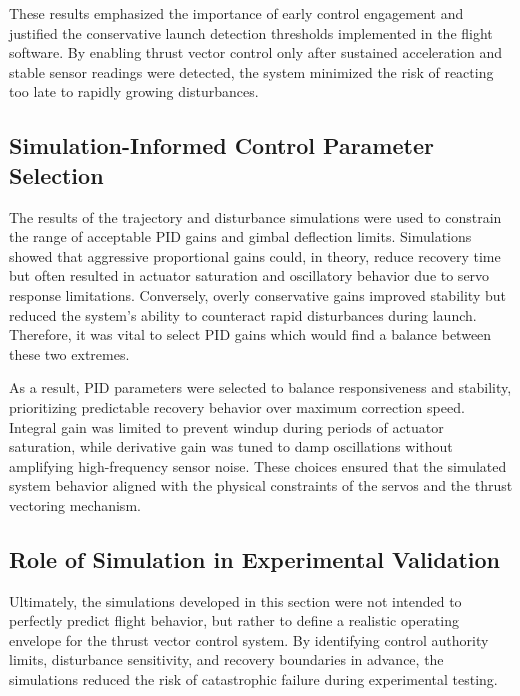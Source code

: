 These results emphasized the importance of early control engagement and justified the conservative launch detection thresholds implemented in the flight software. By enabling thrust vector control only after sustained acceleration and stable sensor readings were detected, the system minimized the risk of reacting too late to rapidly growing disturbances.


\subsection{Simulation-Informed Control Parameter Selection}

The results of the trajectory and disturbance simulations were used to constrain the range of acceptable PID gains and gimbal deflection limits. Simulations showed that aggressive proportional gains could, in theory, reduce recovery time but often resulted in actuator saturation and oscillatory behavior due to servo response limitations. Conversely, overly conservative gains improved stability but reduced the system’s ability to counteract rapid disturbances during launch. Therefore, it was vital to select PID gains which would find a balance between these two extremes.

As a result, PID parameters were selected to balance responsiveness and stability, prioritizing predictable recovery behavior over maximum correction speed. Integral gain was limited to prevent windup during periods of actuator saturation, while derivative gain was tuned to damp oscillations without amplifying high-frequency sensor noise. These choices ensured that the simulated system behavior aligned with the physical constraints of the servos and the thrust vectoring mechanism.


\subsection{Role of Simulation in Experimental Validation}

Ultimately, the simulations developed in this section were not intended to perfectly predict flight behavior, but rather to define a realistic operating envelope for the thrust vector control system. By identifying control authority limits, disturbance sensitivity, and recovery boundaries in advance, the simulations reduced the risk of catastrophic failure during experimental testing.


